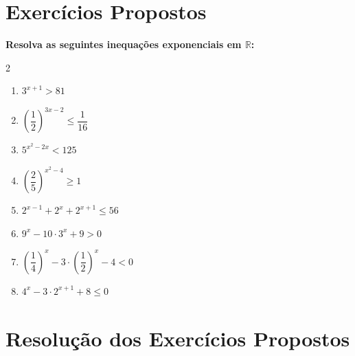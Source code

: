 \documentclass[12pt,a4paper]{report}
\begin{document}
	\section{Exercícios Propostos}
	\label{subsec:propostos_inequacoes}
	
	\textbf{Resolva as seguintes inequações exponenciais em $\mathbb{R}$:}
	\begin{multicols}{2}
		\begin{enumerate}
			\item $3^{x+1} > 81$
			\item $\left( \dfrac{1}{2} \right)^{3x-2} \leqslant \dfrac{1}{16}$
			\item $5^{x^2 - 2x} < 125$
			\item $\left( \dfrac{2}{5} \right)^{x^2 - 4} \geqslant 1$
			\item $2^{x-1} + 2^x + 2^{x+1} \leqslant 56$
			\item $9^x - 10 \cdot 3^x + 9 > 0$
			\item $\left( \dfrac{1}{4} \right)^x - 3 \cdot \left( \dfrac{1}{2} \right)^x - 4 < 0$
			\item $4^x - 3 \cdot 2^{x+1} + 8 \leqslant 0$
		\end{enumerate}
	\end{multicols}
	
	\newpage
	
	\section{Resolução dos Exercícios Propostos}
	\label{subsec:resolucao_inequacoes}
	
\end{document}
